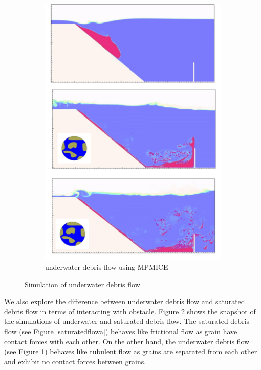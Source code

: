 \documentclass[preprint,12pt]{elsarticle}
\begin{document}
\begin{figure}
\begin{subfigure}[d]{0.5\linewidth}
\includegraphics[width=\linewidth]{MPMICE_debris.jpg}
\caption{underwater debris flow using MPMICE}
\label{saturatedflowb}
\end {subfigure}
\caption{Simulation of underwater debris flow}
\label{saturatedflow}
\end {figure}
%
%
We also explore the difference between underwater debris flow and saturated debris flow in terms of interacting with obstacle. Figure \ref{saturatedflow} shows the snapshot of the simulations of underwater and saturated debris flow. The saturated debris flow (see Figure \ref{saturatedflowa}) behaves like frictional flow as grain have contact forces with each other. On the other hand, the underwater debris flow (see Figure \ref{saturatedflowb}) behaves like tubulent flow as grains are separated from each other and exhibit no contact forces between grains.  \\
\end{document}
